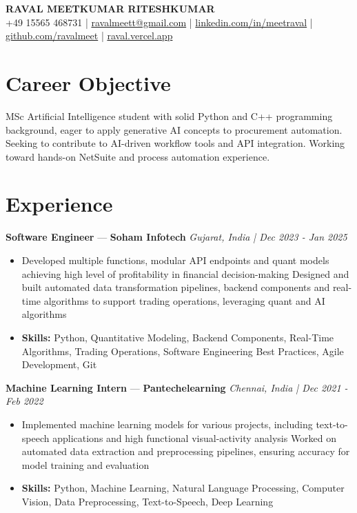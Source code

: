 \documentclass[a4paper,10pt]{article}
\begin{document}
\begin{center}
  {\Large\bfseries RAVAL MEETKUMAR RITESHKUMAR}\\[2pt]
  {\small +49 15565 468731 \;|\; \href{mailto:ravalmeett@gmail.com}{ravalmeett@gmail.com} \;|\; \href{https://www.linkedin.com/in/meetraval/}{linkedin.com/in/meetraval} \;|\; \href{https://github.com/ravalmeet}{github.com/ravalmeet} \;|\; \href{https://raval.vercel.app/}{raval.vercel.app}}
\end{center}
\vspace{-3pt}

\section*{Career Objective}
MSc Artificial Intelligence student with solid Python and C++ programming background, eager to apply generative AI concepts to procurement automation. Seeking to contribute to AI-driven workflow tools and API integration. Working toward hands-on NetSuite and process automation experience.\par

\section*{Experience}
\textbf{Software Engineer} — \textbf{Soham Infotech} \hfill \textit{Gujarat, India \;|\; Dec 2023 - Jan 2025}\par
\vspace{1pt}
\begin{itemize}
  \item Developed multiple functions, modular API endpoints and quant models achieving high level of profitability in financial decision-making Designed and built automated data transformation pipelines, backend components and real-time algorithms to support trading operations, leveraging quant and AI algorithms
  \item \textbf{Skills:} Python, Quantitative Modeling, Backend Components, Real-Time Algorithms, Trading Operations, Software Engineering Best Practices, Agile Development, Git
\end{itemize}
\vspace{3pt}
\textbf{Machine Learning Intern} — \textbf{Pantechelearning} \hfill \textit{Chennai, India \;|\; Dec 2021 - Feb 2022}\par
\vspace{1pt}
\begin{itemize}
  \item Implemented machine learning models for various projects, including text-to-speech applications and high functional visual-activity analysis Worked on automated data extraction and preprocessing pipelines, ensuring accuracy for model training and evaluation
  \item \textbf{Skills:} Python, Machine Learning, Natural Language Processing, Computer Vision, Data Preprocessing, Text-to-Speech, Deep Learning
\end{itemize}
\end{document}
